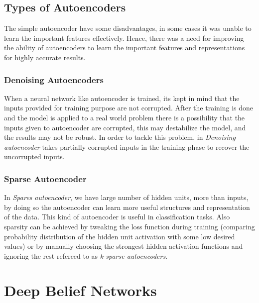 \documentclass[12pt, a4paper]{report}
\begin{document}
\clearpage
\subsection{Types of Autoencoders}\label{sec:types_autoencoder}

The simple autoencoder have some disadvantages, in some cases it was unable to learn the important features effectively. Hence, there was a need for improving the ability of autoencoders to learn the important features and representations for highly accurate results.\\ \par

\subsubsection{Denoising Autoencoders}\label{sec:denoising_autoencoder}

When a neural network like autoencoder is trained, its kept in mind that the inputs provided for training purpose are not corrupted. After the training is done and the model is applied to a real world problem there is a possibility that the inputs given to autoencoder are corrupted, this may destabilize the model, and the results may not be robust. In order to tackle this problem, in \textit{Denoising autoencoder} takes partially corrupted inputs in the training phase to recover the uncorrupted inputs.\\ \par

\subsubsection{Sparse Autoencoder}\label{sec:sparse_autoencoder}

In \textit{Spares autoencoder}, we have large number of hidden units, more than inputs, by doing so the autoencoder can learn more useful structures and representation of the data. This kind of autoencoder is useful in classification tasks. Also sparsity can be achieved by tweaking the loss function during training (comparing probability distribution of the hidden unit activation with some low desired values) or by manually choosing the strongest hidden activation functions and ignoring the rest refereed to as \textit{k-sparse autoencoders}\cite{ksparseautoencoder}.\\ \par

\clearpage
\section{Deep Belief Networks}\label{sec:deep_belief_network}
\end{document}
